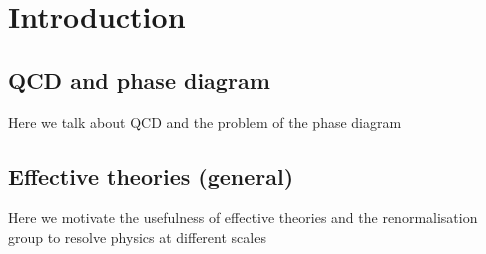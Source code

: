 \chapter{Introduction}
\section{QCD and phase diagram}
Here we talk about QCD and the problem of the phase diagram
\section{Effective theories (general)}
Here we motivate the usefulness of effective theories and the renormalisation group to resolve physics at different scales
